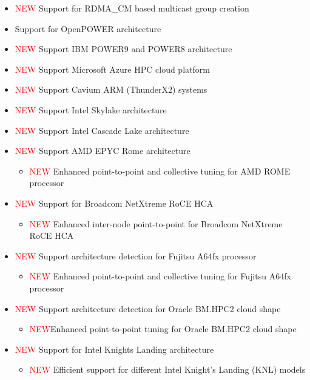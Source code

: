 \begin{itemize}
\begin{itemize}
      \item  \textcolor{red}{NEW} Support for RDMA\_CM based multicast group creation
      \item  Support for OpenPOWER architecture
      \item  \textcolor{red}{NEW} Support IBM POWER9 and POWER8 architecture
      \item  \textcolor{red}{NEW} Support Microsoft Azure HPC cloud platform
      \item  \textcolor{red}{NEW} Support Cavium ARM (ThunderX2) systems
      \item  \textcolor{red}{NEW} Support Intel Skylake architecture
      \item  \textcolor{red}{NEW} Support Intel Cascade Lake architecture
      \item  \textcolor{red}{NEW} Support AMD EPYC Rome architecture
          \begin{itemize}
          \item \textcolor{red}{NEW} Enhanced point-to-point and collective
              tuning for AMD ROME processor
          \end{itemize}
      \item  \textcolor{red}{NEW} Support for Broadcom NetXtreme RoCE HCA
          \begin{itemize}
          \item \textcolor{red}{NEW} Enhanced inter-node point-to-point for
              Broadcom NetXtreme RoCE HCA
          \end{itemize}
      \item  \textcolor{red}{NEW} Support architecture detection for Fujitsu A64fx processor
          \begin{itemize}
          \item \textcolor{red}{NEW} Enhanced point-to-point and collective
              tuning for Fujitsu A64fx processor
          \end{itemize}
	  \item \textcolor{red}{NEW} Support architecture detection for Oracle BM.HPC2 cloud shape
		  \begin{itemize}
		  \item \textcolor{red}{NEW}Enhanced point-to-point tuning for Oracle BM.HPC2 cloud shape
          \end{itemize}
      \item  \textcolor{red}{NEW} Support for Intel Knights Landing architecture
      \begin{itemize}
        \item \textcolor{red}{NEW} Efficient support for different Intel Knight's Landing (KNL) models

\end{itemize}
\end{itemize}
\end{itemize}
